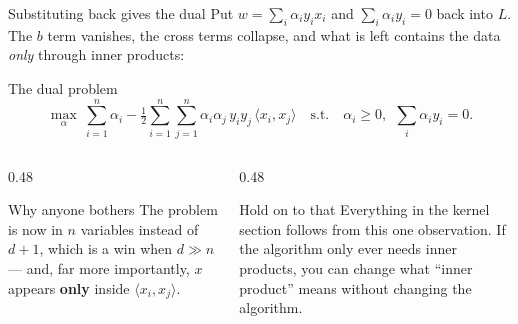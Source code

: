 \documentclass[aspectratio=169]{beamer}
\begin{document}
\begin{frame}[shrink=6]{Substituting back gives the dual}
  Put $w = \sum_i \alpha_i y_i x_i$ and $\sum_i \alpha_i y_i = 0$ back into
  $L$. The $b$ term vanishes, the cross terms collapse, and what is left
  contains the data \emph{only} through inner products:
  \begin{exampleblock}{The dual problem}
    \[
      \max_{\alpha}\ \sum_{i=1}^{n}\alpha_i
        - \tfrac12 \sum_{i=1}^{n}\sum_{j=1}^{n}
          \alpha_i\alpha_j\,y_i y_j\, \langle x_i, x_j\rangle
      \quad\text{s.t.}\quad
      \alpha_i \ge 0,\ \ \sum_i \alpha_i y_i = 0 .
    \]
  \end{exampleblock}
  \begin{columns}[T]
    \begin{column}{0.48\textwidth}
      \begin{block}{Why anyone bothers}
        The problem is now in $n$ variables instead of $d+1$, which is a win
        when $d \gg n$ --- and, far more importantly, $x$ appears
        \textbf{only} inside $\langle x_i, x_j\rangle$.
      \end{block}
    \end{column}
    \begin{column}{0.48\textwidth}
      \begin{alertblock}{Hold on to that}
        Everything in the kernel section follows from this one
        observation. If the algorithm only ever needs inner products, you can
        change what ``inner product'' means without changing the algorithm.
      \end{alertblock}
    \end{column}
  \end{columns}
\end{frame}
\end{document}
